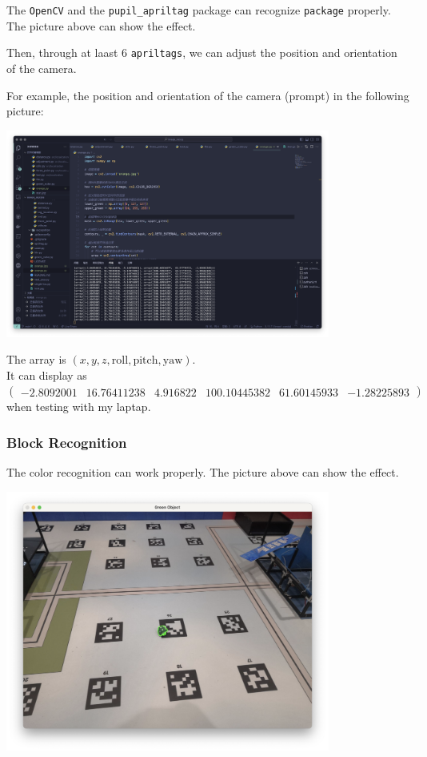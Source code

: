 \documentclass{article}
\begin{document}
The \texttt{OpenCV} and the \texttt{pupil\_apriltag} package can recognize \texttt{package} properly. The picture above can show the effect.

Then, through at laast $6$ \texttt{apriltags}, we can adjust the position and orientation of the camera.

For example, the position and orientation of the camera (prompt) in the following picture:

\includegraphics[width=0.8\textwidth]{figure/l-2.png}

The array is $\left(x,y,z,\mathrm{roll},\mathrm{pitch},\mathrm{yaw}\right)$.\\\indent It can display as $\left(\begin{matrix}-2.8092001&16.76411238&4.916822&100.10445382&61.60145933&-1.28225893\end{matrix}\right)$ when testing with my laptap.

\subsubsection{Block Recognition}

The color recognition can work properly. The picture above can show the effect.

\includegraphics[width=0.8\textwidth]{figure/r-1.png}
\end{document}
